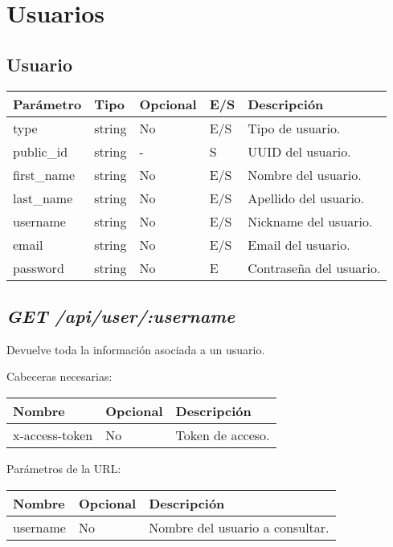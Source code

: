 \section{Usuarios}

\subsection{Usuario}
\begin{table}[h!]
	\centering
	\begin{adjustbox}{max width=\textwidth}
	\begin{tabular}{|l|l|l|l|l|}
		\hline
		Parámetro & Tipo & Opcional & E/S & Descripción \\ \hline
		type & string & No & E/S & Tipo de usuario. \\ \hline
		public\_id & string & - & S & UUID del usuario. \\ \hline
		first\_name & string & No & E/S & Nombre del usuario. \\ \hline
		last\_name & string & No & E/S & Apellido del usuario. \\ \hline
		username & string & No & E/S & Nickname del usuario. \\ \hline
		email & string & No & E/S & Email del usuario. \\ \hline
		password & string & No & E & Contraseña del usuario. \\ \hline
	\end{tabular}
\end{adjustbox}
\end{table}

\subsection{\textit{GET /api/user/:username}}
Devuelve toda la información asociada a un usuario.

Cabeceras necesarias:
\begin{table}[h!]
	\centering
	\begin{adjustbox}{max width=\textwidth}
	\begin{tabular}{|l|l|l|}
		\hline
		Nombre & Opcional & Descripción \\ \hline
		x-access-token & No & Token de acceso. \\ \hline
	\end{tabular}
\end{adjustbox}
\end{table}

Parámetros de la URL:
\begin{table}[h!]
	\centering
	\begin{adjustbox}{max width=\textwidth}
	\begin{tabular}{|l|l|l|}
		\hline
		Nombre & Opcional & Descripción \\ \hline
		username & No & Nombre del usuario a consultar. \\ \hline
	\end{tabular}
\end{adjustbox}
\end{table}

